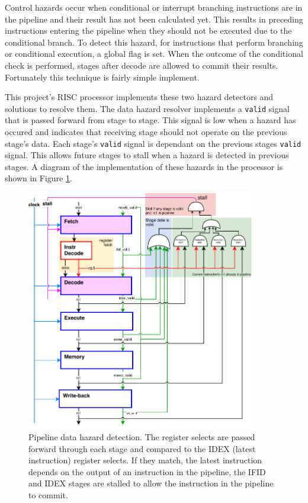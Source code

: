 \documentclass[11pt,a4paper]{report}
\begin{document}
{Control hazards occur when conditional or interrupt branching instructions are in the pipeline and their result has not been calculated yet. This results in preceding instructions entering the pipeline when they should not be executed due to the conditional branch. To detect this hazard, for instructions that perform branching or conditional execution, a global flag is set. When the outcome of the conditional check is performed, stages after decode are allowed to commit their results. Fortunately this technique is fairly simple implement.

This project's RISC processor implements these two hazard detectors and solutions to resolve them. The data hazard resolver implements a \verb|valid| signal that is passed forward from stage to stage. This signal is low when a hazard has occured and indicates that receiving stage should not operate on the previous stage's data. Each stage's \verb|valid| signal is dependant on the previous stages \verb|valid| signal. This allows future stages to stall when a hazard is detected in previous stages. A diagram of the implementation of these hazards in the processor is shown in Figure \ref{fig:stall}.

\begin{figure}[h]
\centering 
\includegraphics[width=10cm]{../img/stall}
\caption{Pipeline data hazard detection. The register selects are passed forward through each stage and compared to the IDEX (latest instruction) register selects. If they match, the latest instruction depends on the output of an instruction in the pipeline, the IFID and IDEX stages are stalled to allow the instruction in the pipeline to commit.}
\label{fig:stall}
\end{figure}

}
\end{document}
